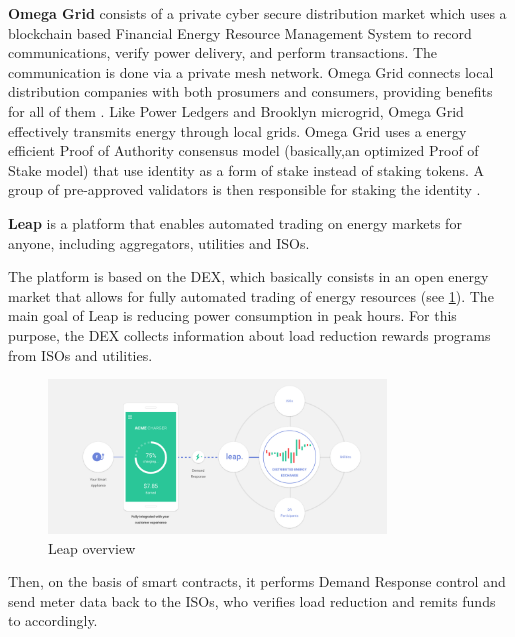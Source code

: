\textbf{Omega Grid} consists of a private cyber secure distribution market \cite{STARTUPSWHOISWHO} which uses a blockchain based Financial Energy Resource Management System  to record communications, verify power delivery, and perform transactions. The communication is done via a private mesh network. Omega Grid connects local distribution companies with both prosumers and consumers, providing benefits for all of them \cite{omegagrid}. Like Power Ledgers and Brooklyn microgrid, Omega Grid effectively transmits energy through local grids. Omega Grid uses a energy efficient Proof of Authority consensus model (basically,an optimized Proof of Stake model) that use identity as a form of stake instead of  staking tokens. A group of pre-approved validators is then responsible for staking the identity \cite{poa}. 




\textbf{Leap} is a platform that enables automated trading on energy markets for anyone, including aggregators, utilities and \acp{ISO}.


The platform is based on the \ac{DEX}, which basically consists in an open energy market that allows for fully automated trading of energy resources \cite{leap} (see \cref{fig:leap}). The main goal of Leap is reducing power consumption in peak hours. For this purpose, the \ac{DEX} collects  information about load reduction rewards programs from \acp{ISO} and utilities.


\begin{figure}[h]
\centering
\includegraphics[width=0.8\textwidth]{./Images/leap}
\caption{Leap overview}
\label{fig:leap}
\end{figure}

Then, on the basis of smart contracts, it performs Demand Response control and send meter data back to the \acp{ISO}, who verifies load reduction and remits funds to accordingly. 


